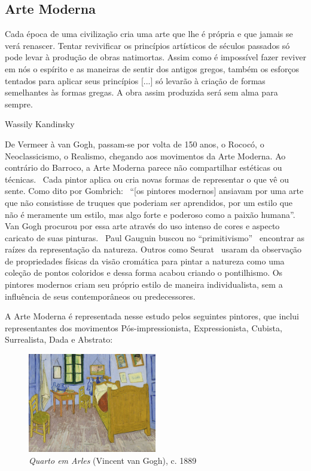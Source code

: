 \subsection{Arte Moderna}

\setlength{\epigraphwidth}{0.8\textwidth}
\epigraph{Cada época de uma civilização cria uma arte que lhe é própria e que
  jamais se verá renascer. Tentar revivificar os princípios artísticos de
  séculos passados só pode levar à produção de obras natimortas. Assim como é
  impossível fazer reviver em nós o espírito e as maneiras de sentir dos antigos
  gregos, também os esforços tentados para aplicar seus princípios [...] só
  levarão à criação de formas semelhantes às formas gregas. A obra assim
  produzida será sem alma para sempre.}{Wassily Kandinsky~\cite{kandinsky}}

De Vermeer à van Gogh, passam-se por volta de 150 anos, o Rococó, o
Neoclassicismo, o Realismo, chegando aos movimentos da Arte
Moderna. Ao contrário do Barroco, a Arte Moderna parece não
compartilhar estéticas ou técnicas.~\cite{dempsey} Cada pintor aplica
ou cria novas formas de representar o que vê ou sente. Como dito
por Gombrich:~\cite{gombrich} ``[os pintores modernos] ansiavam por uma
arte que não consistisse de truques que poderiam ser aprendidos, por
um estilo que não é meramente um estilo, mas algo forte e poderoso
como a paixão humana''. Van Gogh procurou por essa arte através do uso
intenso de cores e aspecto caricato de suas pinturas.~\cite{hulsker}
Paul Gauguin buscou no ``primitivismo''~\cite{lovejoy} encontrar as
raízes da representação da natureza. Outros como Seurat~\cite{kemp}
usaram da observação de propriedades físicas da visão cromática para
pintar a natureza como uma coleção de pontos coloridos e dessa forma
acabou criando o pontilhismo. Os pintores modernos criam seu próprio
estilo de maneira individualista, sem a influência de seus
contemporâneos ou predecessores.~\cite{gombrich}

A Arte Moderna é representada nesse estudo pelos seguintes pintores,
que inclui representantes dos movimentos Pós-impressionista,
Expressionista, Cubista, Surrealista, Dada e Abstrato:

\begin{figure}
  \begin{centering}
    \caption{\emph{Quarto em Arles} (Vincent van Gogh), c. 1889}
    \label{fig:vangogh:quarto}
    \includegraphics[width=0.5\textwidth]{figs/vangogh_quarto.png}
  \end{centering}
\end{figure}

